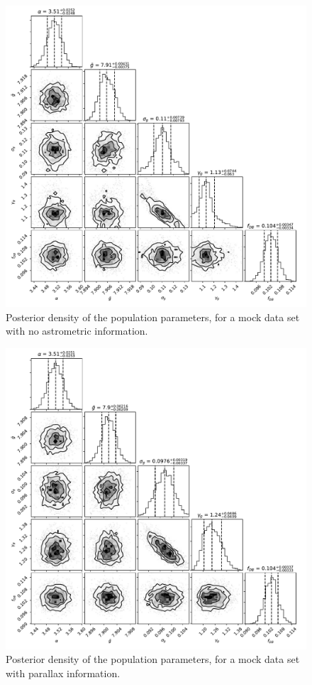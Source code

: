 \documentclass[fleqn,usenatbib]{mnras}
\begin{document}
\begin{figure}
	\includegraphics[width=1.\textwidth]{toy_chain.pdf}
    \caption{Posterior density of the population parameters, for a mock data set with no astrometric information.}
    \label{fig:chain}
\end{figure}

\begin{figure}
	\includegraphics[width=1.\textwidth]{toy_chain_include-parallax.pdf}
    \caption{Posterior density of the population parameters, for a mock data set with parallax information.}
    \label{fig:chain_parallax}
\end{figure}
\end{document}
